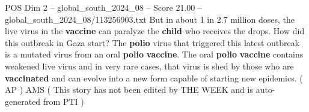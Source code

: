 \begin{textsample}{POS Dim 2 – global\_south\_2024\_08 – Score 21.00 – global\_south\_2024\_08/113256903.txt}
But in about 1 in 2.7 million doses, the live virus in the \textbf{vaccine} can paralyze the \textbf{child} who receives the drops.
How did this outbreak in Gaza start?
The \textbf{polio} virus that triggered this latest outbreak is a mutated virus from an oral \textbf{polio} \textbf{vaccine}.
The oral \textbf{polio} \textbf{vaccine} contains weakened live virus and in very rare cases, that virus is shed by those who are \textbf{vaccinated} and can evolve into a new form capable of starting new epidemics. ( AP ) AMS ( This story has not been edited by THE WEEK and is auto-generated from PTI )

\end{textsample}
